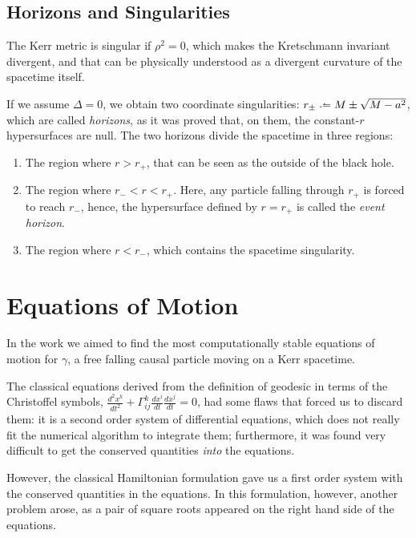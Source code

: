 \subsection{Horizons and Singularities}

The Kerr metric is singular if $\rho^2 = 0$, which makes the Kretschmann invariant divergent, and that can be physically understood as a divergent curvature of the spacetime itself.

If we assume $\Delta = 0$, we obtain two coordinate singularities: $r_{\pm} \defeq M \pm \sqrt{M - a^2}$, which are called \emph{horizons}, as it was proved that, on them, the constant-$r$ hypersurfaces are null. The two horizons divide the spacetime in three regions:
\begin{enumerate}
	\item The region where $r > r_+$, that can be seen as the outside of the black hole.
	\item The region where $r_- < r < r_+$. Here, any particle falling through $r_+$ is forced to reach $r_-$, hence, the hypersurface defined by $r = r_+$ is called the \emph{event horizon}.
	\item The region where $r < r_-$, which contains the spacetime singularity.
\end{enumerate}











\section{Equations of Motion}
\label{chapter:equations}

In the work we aimed to find the most computationally stable equations of motion for $\gamma$, a free falling causal particle moving on a Kerr spacetime.

The classical equations derived from the definition of geodesic in terms of the Christoffel symbols, $\frac{d^2x^k}{dt^2} + \Gamma^k_{ij} \frac{d x^i}{dt} \frac{d x^j}{dt} = 0$, had some flaws that forced us to discard them: it is a second order system of differential equations, which does not really fit the numerical algorithm to integrate them; furthermore, it was found very difficult to get the conserved quantities \emph{into} the equations.

However, the classical Hamiltonian formulation \cite[Sec. 33.5]{thorne73} gave us a first order system with the conserved quantities in the equations. In this formulation, however, another problem arose, as a pair of square roots appeared on the right hand side of the equations.

